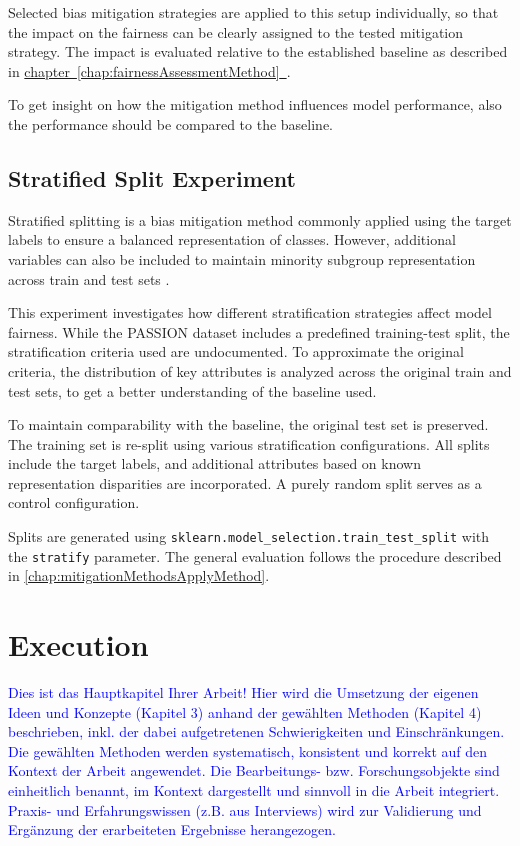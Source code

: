 \documentclass[12pt, a4paper, oneside]{book}   	%
\newcommand{\linkchap}[1]{\hyperref[#1]{chapter~\ref{#1}~\nameref{#1}}}
\newcommand{\baaCriteria}[1]{\textcolor{blue}{#1}}
\begin{document}
		Selected bias mitigation strategies are applied to this setup individually, so that the impact on the fairness can be clearly assigned to the tested mitigation strategy. The impact is evaluated relative to the established baseline as described in \linkchap{chap:fairnessAssessmentMethod}.
		
		To get insight on how the mitigation method influences model performance, also the performance should be compared to the baseline.
		
		\section{Stratified Split Experiment}
		Stratified splitting is a bias mitigation method commonly applied using the target labels to ensure a balanced representation of classes. However, additional variables can also be included to maintain minority subgroup representation across train and test sets \autocite{Balde_2023}.
		
		This experiment investigates how different stratification strategies affect model fairness. While the PASSION dataset includes a predefined training-test split, the stratification criteria used are undocumented. To approximate the original criteria, the distribution of key attributes is analyzed across the original train and test sets, to get a better understanding of the baseline used.
		
		To maintain comparability with the baseline, the original test set is preserved. The training set is re-split using various stratification configurations. All splits include the target labels, and additional attributes based on known representation disparities are incorporated. A purely random split serves as a control configuration.
		
		Splits are generated using \texttt{sklearn.model\_selection.train\_test\_split} with the \texttt{stratify} parameter. The general evaluation follows the procedure described in \autoref{chap:mitigationMethodsApplyMethod}.
		
	\chapter{Execution}
		\baaCriteria{Dies ist das Hauptkapitel Ihrer Arbeit! Hier wird die Umsetzung der eigenen Ideen und Konzepte (Kapitel 3) anhand der gewählten Methoden (Kapitel 4) beschrieben, inkl. der dabei aufgetretenen Schwierigkeiten und Einschränkungen.}
		\baaCriteria{Die gewählten Methoden werden systematisch, konsistent und korrekt auf den Kontext der Arbeit angewendet. Die Bearbeitungs- bzw. Forschungsobjekte sind einheitlich benannt, im Kontext dargestellt und sinnvoll in die Arbeit integriert. Praxis- und Erfahrungswissen (z.B. aus Interviews) wird zur Validierung und Ergänzung der erarbeiteten Ergebnisse herangezogen. }
		
\end{document}
